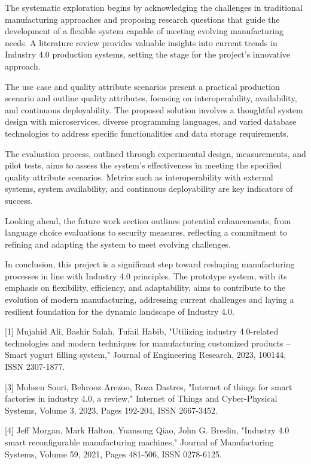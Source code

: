 \documentclass[conference]{IEEEtran}
\begin{document}
The systematic exploration begins by acknowledging the challenges in traditional manufacturing approaches and proposing research questions that guide the development of a flexible system capable of meeting evolving manufacturing needs. A literature review provides valuable insights into current trends in Industry 4.0 production systems, setting the stage for the project's innovative approach.

The use case and quality attribute scenarios present a practical production scenario and outline quality attributes, focusing on interoperability, availability, and continuous deployability. The proposed solution involves a thoughtful system design with microservices, diverse programming languages, and varied database technologies to address specific functionalities and data storage requirements.

The evaluation process, outlined through experimental design, measurements, and pilot tests, aims to assess the system's effectiveness in meeting the specified quality attribute scenarios. Metrics such as interoperability with external systems, system availability, and continuous deployability are key indicators of success.

Looking ahead, the future work section outlines potential enhancements, from language choice evaluations to security measures, reflecting a commitment to refining and adapting the system to meet evolving challenges.

In conclusion, this project is a significant step toward reshaping manufacturing processes in line with Industry 4.0 principles. The prototype system, with its emphasis on flexibility, efficiency, and adaptability, aims to contribute to the evolution of modern manufacturing, addressing current challenges and laying a resilient foundation for the dynamic landscape of Industry 4.0.



[1] Mujahid Ali, Bashir Salah, Tufail Habib, "Utilizing industry 4.0-related technologies and modern techniques for manufacturing customized products – Smart yogurt filling system," Journal of Engineering Research, 2023, 100144, ISSN 2307-1877.

[3] Mohsen Soori, Behrooz Arezoo, Roza Dastres, "Internet of things for smart factories in industry 4.0, a review," Internet of Things and Cyber-Physical Systems, Volume 3, 2023, Pages 192-204, ISSN 2667-3452.

[4] Jeff Morgan, Mark Halton, Yuansong Qiao, John G. Breslin, "Industry 4.0 smart reconfigurable manufacturing machines," Journal of Manufacturing Systems, Volume 59, 2021, Pages 481-506, ISSN 0278-6125.
\end{document}
